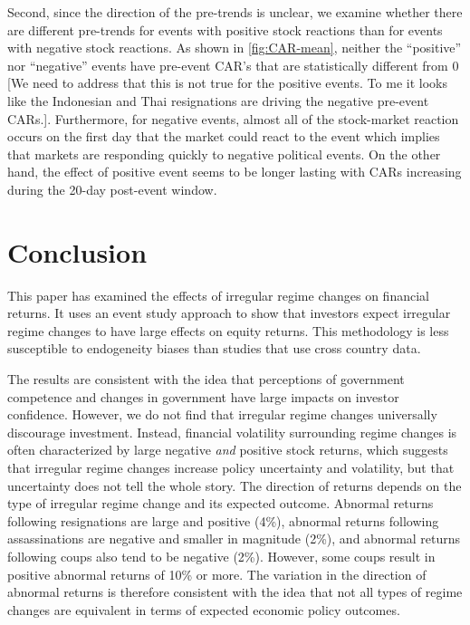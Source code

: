 \documentclass[12pt,final,fleqn]{article}
\theoremstyle{plain}
\begin{document}
Second, since the direction of the pre-trends is unclear, we examine whether there are different pre-trends for events with positive stock reactions than for events with negative stock reactions. As shown in \autoref{fig:CAR-mean}, neither the ``positive'' nor ``negative'' events have pre-event CAR's that are statistically different from 0 [We need to address that this is not true for the positive events. To me it looks like the Indonesian and Thai resignations are driving the negative pre-event CARs.]. Furthermore, for negative events, almost all of the stock-market reaction occurs on the first day that the market could react to the event which implies that markets are responding quickly to negative political events. On the other hand, the effect of positive event seems to be longer lasting with CARs increasing during the 20-day post-event window. 

\section{Conclusion}
This paper has examined the effects of irregular regime changes on financial returns. It uses an event study approach to show that investors expect irregular regime changes to have large effects on equity returns. This methodology is less susceptible to endogeneity biases than studies that use cross country data.

The results are consistent with the idea that perceptions of government competence and changes in government have large impacts on investor confidence. However, we do not find that irregular regime changes universally discourage investment. Instead, financial volatility surrounding regime changes is often characterized by large negative \textit{and} positive stock returns, which suggests that irregular regime changes increase policy uncertainty and volatility, but that uncertainty does not tell the whole story. The direction of returns depends on the type of irregular regime change and its expected outcome. Abnormal returns following resignations are large and positive (4\%), abnormal returns following assassinations are negative and smaller in magnitude (2\%), and abnormal returns following coups also tend to be negative (2\%). However, some coups result in positive abnormal returns of 10\% or more. The variation in the direction of abnormal returns is therefore consistent with the idea that not all types of regime changes are equivalent in terms of expected economic policy outcomes. 
\end{document}
